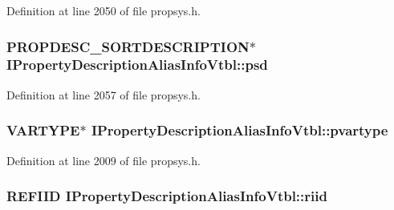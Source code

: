 Definition at line 2050 of file propsys.\+h.

\subsubsection[{\texorpdfstring{psd}{psd}}]{ {\bf P\+R\+O\+P\+D\+E\+S\+C\+\_\+\+S\+O\+R\+T\+D\+E\+S\+C\+R\+I\+P\+T\+I\+ON}$\ast$ I\+Property\+Description\+Alias\+Info\+Vtbl\+::psd}\hypertarget{struct_i_property_description_alias_info_vtbl_a7c49d54891df5a2da345c637bc821ded}{}\label{struct_i_property_description_alias_info_vtbl_a7c49d54891df5a2da345c637bc821ded}


Definition at line 2057 of file propsys.\+h.

\subsubsection[{\texorpdfstring{pvartype}{pvartype}}]{ V\+A\+R\+T\+Y\+PE$\ast$ I\+Property\+Description\+Alias\+Info\+Vtbl\+::pvartype}\hypertarget{struct_i_property_description_alias_info_vtbl_ad5c9253946afdb8b3a4ff4f51a3c4291}{}\label{struct_i_property_description_alias_info_vtbl_ad5c9253946afdb8b3a4ff4f51a3c4291}


Definition at line 2009 of file propsys.\+h.

\subsubsection[{\texorpdfstring{riid}{riid}}]{ {\bf R\+E\+F\+I\+ID} I\+Property\+Description\+Alias\+Info\+Vtbl\+::riid}\hypertarget{struct_i_property_description_alias_info_vtbl_acd5119da80a0798a859a39662d6d0d6d}{}\label{struct_i_property_description_alias_info_vtbl_acd5119da80a0798a859a39662d6d0d6d}


